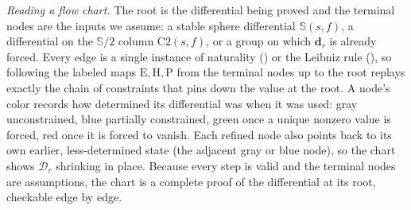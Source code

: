 \documentclass[dvipsnames,table]{amsart}
\theoremstyle{definition}
\theoremstyle{remark}
\numberwithin{equation}{section}
\begin{document}
\noindent\emph{Reading a flow chart.} The root is the differential being proved
and the terminal nodes are the inputs we assume: a stable sphere differential
$\mathbb{S}(s,f)$, a differential on the $\mathbb{S}/2$ column $\mathrm{C2}(s,f)$, or a group on
which $\mathbf{d}_r$ is already forced. Every edge is a single instance of
naturality () or the Leibniz rule (), so
following the labeled maps $\mathrm{E},\mathrm{H},\mathrm{P}$ from the terminal
nodes up to the root replays exactly the chain of constraints that pins down the
value at the root. A node's color records how determined its differential was
when it was used: gray unconstrained, blue partially constrained, green once a
unique nonzero value is forced, red once it is forced to vanish. Each
refined node also points back to its own earlier, less-determined state (the
adjacent gray or blue node), so the chart shows $\mathcal{D}_r$ shrinking in place.
Because every step is valid and the terminal nodes are assumptions, the chart is
a complete proof of the differential at its root, checkable edge by edge.
\end{document}
